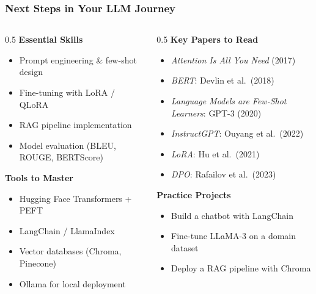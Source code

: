 \begin{frame}[fragile]\frametitle{Next Steps in Your LLM Journey}
\begin{columns}
  \begin{column}[T]{0.5\linewidth}
    \textbf{Essential Skills}
    \begin{itemize}
    \item Prompt engineering \& few-shot design
    \item Fine-tuning with LoRA / QLoRA
    \item RAG pipeline implementation
    \item Model evaluation (BLEU, ROUGE, BERTScore)
    \end{itemize}
    \textbf{Tools to Master}
    \begin{itemize}
    \item Hugging Face Transformers + PEFT
    \item LangChain / LlamaIndex
    \item Vector databases (Chroma, Pinecone)
    \item Ollama for local deployment
    \end{itemize}
  \end{column}
  \begin{column}[T]{0.5\linewidth}
    \textbf{Key Papers to Read}
    \begin{itemize}
    \item \emph{Attention Is All You Need} (2017)
    \item \emph{BERT}: Devlin et al.\ (2018)
    \item \emph{Language Models are Few-Shot Learners}: GPT-3 (2020)
    \item \emph{InstructGPT}: Ouyang et al.\ (2022)
    \item \emph{LoRA}: Hu et al.\ (2021)
    \item \emph{DPO}: Rafailov et al.\ (2023)
    \end{itemize}
    \textbf{Practice Projects}
    \begin{itemize}
    \item Build a chatbot with LangChain
    \item Fine-tune LLaMA-3 on a domain dataset
    \item Deploy a RAG pipeline with Chroma
    \end{itemize}
  \end{column}
\end{columns}
\end{frame}